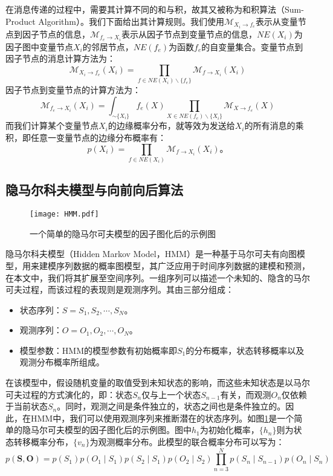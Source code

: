 \documentclass{xdupgthesis}
\begin{document}
在消息传递的过程中，需要其计算不同的和与积，故其又被称为和积算法（Sum-Product Algorithm）。我们下面给出其计算规则。我们使用$\mathcal{M}_{X_i \rightarrow f_e}$表示从变量节点到因子节点的信息，$\mathcal{M}_{f_e \rightarrow X_i}$表示从因子节点到变量节点的信息，$NE(X_i)$为因子图中变量节点$X_i$的邻居节点，$NE(f_e)$为函数$f_e$的自变量集合。变量节点到因子节点的消息计算方法为：
\begin{equation}
    \mathcal{M}_{X_i \rightarrow f_e}(X_i)=\prod_{f \in NE(X_i) \backslash\{f_e\}} \mathcal{M}_{f \rightarrow X_i}(X_i)
\end{equation}
因子节点到变量节点的计算方法为：
\begin{equation}
    \mathcal{M}_{ f_e\rightarrow X_i}(X_i)=\int_{\sim\{X_i\}}f_e(X)\prod_{X \in NE(f_e) \backslash\{X_i\}} \mathcal{M}_{X \rightarrow f_e}(X)
\end{equation}
而我们计算某个变量节点$X_i$的边缘概率分布，就等效为发送给$X_i$的所有消息的乘积，即任意一变量节点的边缘分布概率有：
\begin{equation}
    p\left(X_i\right)= \prod_{f \in NE(X_i)} \mathcal{M}_{ f\rightarrow X_i}(X_i)。
\end{equation}

\subsection{隐马尔科夫模型与向前向后算法}
\begin{figure}[!htb]
    \centering
    \texttt{[image: HMM.pdf]}
    \caption{一个简单的隐马尔可夫模型的因子图化后的示例图}
    \label{HMM}
\end{figure}
隐马尔科夫模型（Hidden Markov Model，HMM）\cite{rabiner1986introduction,mor2021systematic}是一种基于马尔可夫有向图模型，用来建模序列数据的概率图模型，其广泛应用于时间序列数据的建模和预测，在本文中，我们将其扩展至空间序列。一组序列可以描述一个未知的、隐含的马尔可夫过程，而该过程的表现则是观测序列。其由三部分组成：
\begin{itemize}
    \item 状态序列：$S={S_1,S_2,\cdots,S_N}$。
    \item 观测序列：$O={O_1,O_2,\cdots,O_N}$。
    \item 模型参数：HMM的模型参数有初始概率即$S_1$的分布概率，状态转移概率以及观测分布概率所组成。
\end{itemize}
在该模型中，假设随机变量的取值受到未知状态的影响，而这些未知状态是以马尔可夫过程的方式演化的，即：状态$S_n$仅与上一个状态$S_{n-1}$有关，而观测$O_n$仅依赖于当前状态$S_n$。同时，观测之间是条件独立的，状态之间也是条件独立的。因此，在HMM中，我们可以使用观测序列来推断潜在的状态序列。如图\ref{HMM}是一个简单的隐马尔可夫模型的因子图化后的示例图。图中$h_1$为初始化概率，$\{h_n\}$则为状态转移概率分布，$\{v_n\}$为观测概率分布。此模型的联合概率分布可以写为：
\begin{equation}
    p\left(\mathbf{S}, \mathbf{O}\right)=p\left(S_{1}\right) p\left(O_{1} \mid S_{1}\right) p\left(S_{2} \mid S_{1}\right) p\left(O_{2} \mid S_{2}\right) \prod_{n=3}^{N} p\left(S_{n} \mid S_{n-1}\right) p\left(O_{n} \mid S_{n}\right)
\end{equation}
\end{document}
